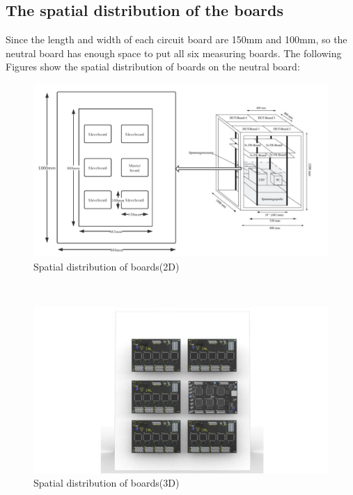 \subsection{The spatial distribution of the boards}
\label{sec:The spatial distribution of the boards}
Since the length and width of each circuit board are 150mm and 100mm, so the neutral board has enough space to put all six measuring boards. The following Figures show the spatial distribution of boards on the neutral board:
\begin{figure}[!ht]
	\centering
	\includegraphics[width=16cm]{grafiken/5.2.pdf}
	\caption{Spatial distribution of boards(2D)} 
	\label{fig:5.2}
\end{figure}
\FloatBarrier
\\

\begin{figure}[!ht]
	\centering
	\includegraphics[width=16cm]{grafiken/5.3.pdf}
	\caption{Spatial distribution of boards(3D)} 
	\label{fig:5.3}
\end{figure}
\FloatBarrier




